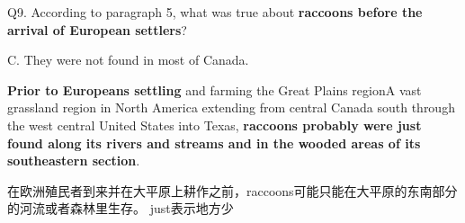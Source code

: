 \begin{blk}
    \begin{qst}
        Q9. According to paragraph 5, what was true about \textbf{raccoons before the arrival of European settlers}?
    \end{qst}

    \begin{chc}
        C. They were not found in most of Canada.
    \end{chc}

    \begin{psgq}
        \textbf{Prior to Europeans settling} and farming the Great Plains regionA vast grassland region in North America extending from central Canada south through the west central United States into Texas, \textbf{raccoons probably were just found along its rivers and streams and in the wooded areas of its southeastern section}.
    \end{psgq}

    \begin{nlz}
        在欧洲殖民者到来并在大平原上耕作之前，raccoons可能只能在大平原的东南部分的河流或者森林里生存。 just表示地方少
    \end{nlz}
\end{blk}

\newpage